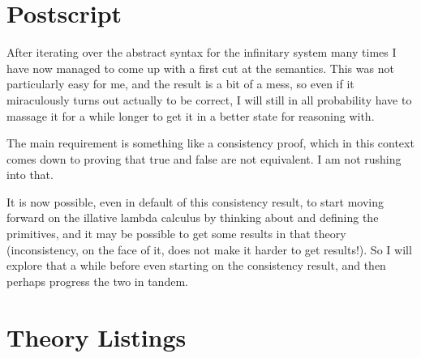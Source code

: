 
\section{Postscript}\label{POSTSCRIPT}

After iterating over the abstract syntax for the infinitary system many times I have now managed to come up with a first cut at the semantics.
This was not particularly easy for me, and the result is a bit of a mess, so even if it miraculously turns out actually to be correct, I will still in all probability have to massage it for a while longer to get it in a better state for reasoning with.

The main requirement is something like a consistency proof, which in this context comes down to proving that true and false are not equivalent.
I am not rushing into that.

It is now possible, even in default of this consistency result, to start moving forward on the illative lambda calculus by thinking about and defining the primitives, and it may be possible to get some results in that theory (inconsistency, on the face of it, does not make it harder to get results!).
So I will explore that a while before even starting on the consistency result, and then perhaps progress the two in tandem.

\appendix

\section{Theory Listings}

\vfill

{
\let\Section\subsection
\let\Subsection\subsubsection
\def\subsection#1{\Subsection*{#1}}

\def\section#1{\Section{#1}\label{icomb}}

\def\section#1{\Section{#1}\label{ilamb}}

}  %


